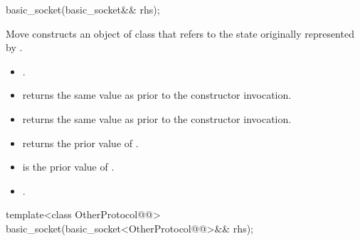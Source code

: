\begin{itemdecl}
basic_socket(basic_socket&& rhs);
\end{itemdecl}

\begin{itemdescr}
\pnum
\effects Move constructs an object of class  that refers to the state originally represented by .

\pnum
\postconditions
\begin{itemize}
\item
{}.
\item
{} returns the same value as  prior to the constructor invocation.
\item
{} returns the same value as  prior to the constructor invocation.
\item
{} returns the prior value of .
\item
{} is the prior value of .
\item
{}.
\end{itemize}
\end{itemdescr}

\begin{itemdecl}
template<class OtherProtocol@@>
  basic_socket(basic_socket<OtherProtocol@@>&& rhs);
\end{itemdecl}

